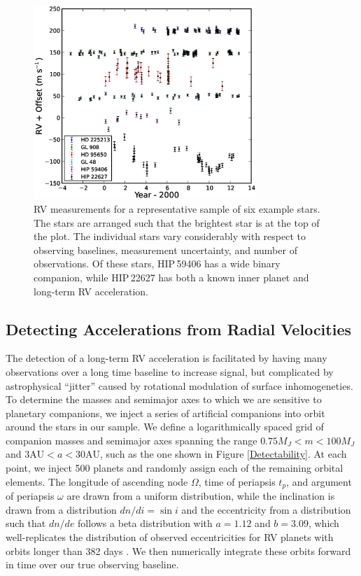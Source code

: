 \begin{figure}[htbp]
\centerline{\includegraphics[width=0.75\textwidth]{chapter3/f2.eps}}
\caption[RV measurements for a representative sample of six example stars]{RV measurements for a representative sample of six example stars. The stars are arranged such that the brightest star is at the top of the plot. The individual stars vary considerably with respect to observing baselines, measurement uncertainty, and number of observations. Of these stars, HIP\,59406 has a wide binary companion, while HIP\,22627 has both a known inner planet and long-term RV acceleration.
  }
\label{RVfig}
\end{figure}

\subsection{Detecting Accelerations from Radial Velocities}
\label{RVs}

The detection of a long-term RV acceleration is facilitated by having many observations over a long time baseline to increase signal, but complicated by astrophysical ``jitter'' caused by rotational modulation of surface inhomogeneties. To determine the masses and semimajor axes to which we are sensitive to planetary companions, we inject a series of artificial companions into orbit around the stars in our sample. We define a logarithmically spaced grid of companion masses and semimajor axes spanning the range $0.75 M_J < m < 100 M_J$ and $3 \textrm{AU} < a < 30 \textrm{AU}$, such as the one shown in Figure \ref{Detectability}. At each point, we inject 500 planets and randomly assign each of the remaining orbital elements. The longitude of ascending node $\Omega$, time of periapsis $t_p$, and argument of periapsis $\omega$ are drawn from a uniform distribution, while the inclination is drawn from a distribution $dn/di = \sin i$ and the eccentricity from a distribution such that $dn/de$ follows a beta distribution with $a = 1.12$ and $b = 3.09$, which well-replicates the distribution of observed eccentricities for RV planets with orbits longer than 382 days \citep{Kipping13}. We then numerically integrate these orbits forward in time over our true observing baseline. 



